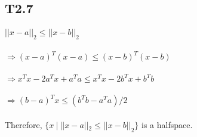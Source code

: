 \subsection*{T2.7}
\paragraph{}
$||x-a||_2 \leq ||x-b||_2$
\paragraph{} 
$\Rightarrow (x-a)^T(x-a) \leq (x-b)^T(x-b)$
\paragraph{} 
$\Rightarrow x^Tx - 2a^Tx +a^Ta \leq x^Tx -2b^Tx +b^Tb$
\paragraph{}
$\Rightarrow (b-a)^T x \leq (b^Tb - a^Ta)/2$
\paragraph{}
Therefore, $\{x\ |\ ||x-a||_2 \leq ||x-b||_2 \} $ is a halfspace.
